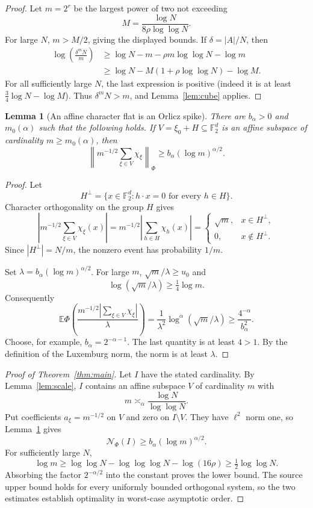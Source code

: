 \documentclass[11pt]{article}
\newtheorem{lemma}[theorem]{Lemma}
\newcommand{\F}{\mathbb F}
\newcommand{\E}{\mathbb E}
\newcommand{\Nphi}{\mathcal N_{\Phi}}
\begin{document}
\begin{proof}
Let $m=2^r$ be the largest power of two not exceeding
\[
 M=\frac{\log N}{8\rho\log\log N}.
\]
For large $N$, $m>M/2$, giving the displayed bounds.  If
$\delta=|A|/N$, then
\begin{align*}
 \log\left(\frac{\delta^mN}{m}\right)
 &\ge \log N-m-\rho m\log\log N-\log m\\
 &\ge \log N-M(1+\rho\log\log N)-\log M.
\end{align*}
For all sufficiently large $N$, the last expression is positive (indeed it
is at least $\tfrac34\log N-\log M$).  Thus
$\delta^mN>m$, and Lemma~\ref{lem:cube} applies.
\end{proof}

\begin{lemma}[An affine character flat is an Orlicz spike]
\label{lem:spike}
There are $b_\alpha>0$ and $m_0(\alpha)$ such that the following holds.
If $V=\xi_0+H\subseteq\F_2^d$ is an affine subspace of cardinality
$m\ge m_0(\alpha)$, then
\[
 \left\|m^{-1/2}\sum_{\xi\in V}\chi_\xi\right\|_\Phi
 \ge b_\alpha(\log m)^{\alpha/2}.
\]
\end{lemma}

\begin{proof}
Let
\[
 H^\perp=\{x\in\F_2^d:h\cdot x=0\text{ for every }h\in H\}.
\]
Character orthogonality on the group $H$ gives
\[
 \left|m^{-1/2}\sum_{\xi\in V}\chi_\xi(x)\right|
 =m^{-1/2}\left|\sum_{h\in H}\chi_h(x)\right|
 =\begin{cases}
 \sqrt m,&x\in H^\perp,\\
 0,&x\notin H^\perp.
 \end{cases}
\]
Since $|H^\perp|=N/m$, the nonzero event has probability $1/m$.

Set $\lambda=b_\alpha(\log m)^{\alpha/2}$.  For large $m$,
$\sqrt m/\lambda\ge u_0$ and
\[
 \log(\sqrt m/\lambda)\ge\tfrac14\log m.
\]
Consequently
\[
 \E\Phi\left(
 \frac{m^{-1/2}|\sum_{\xi\in V}\chi_\xi|}{\lambda}
 \right)
 =\frac1{\lambda^2}
 \log^\alpha(\sqrt m/\lambda)
 \ge\frac{4^{-\alpha}}{b_\alpha^2}.
\]
Choose, for example, $b_\alpha=2^{-\alpha-1}$.  The last quantity is at
least $4>1$.  By the definition of the Luxemburg norm, the norm is at least
$\lambda$.
\end{proof}

\begin{proof}[Proof of Theorem~\ref{thm:main}]
Let $I$ have the stated cardinality.  By Lemma~\ref{lem:scale}, $I$ contains
an affine subspace $V$ of cardinality $m$ with
\[
 m\asymp_\alpha\frac{\log N}{\log\log N}.
\]
Put coefficients $a_\xi=m^{-1/2}$ on $V$ and zero on $I\setminus V$.
They have $\ell^2$ norm one, so Lemma~\ref{lem:spike} gives
\[
 \Nphi(I)\ge b_\alpha(\log m)^{\alpha/2}.
\]
For sufficiently large $N$,
\[
 \log m
 \ge\log\log N-\log\log\log N-\log(16\rho)
 \ge\tfrac12\log\log N.
\]
Absorbing the factor $2^{-\alpha/2}$ into the constant proves the lower
bound.  The source upper bound holds for every uniformly bounded orthogonal
system, so the two estimates establish optimality in worst-case asymptotic
order.
\end{proof}
\end{document}
